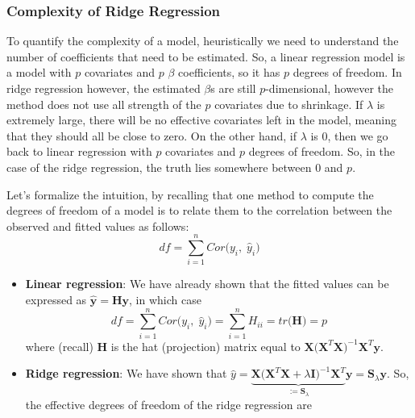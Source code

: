 \documentclass[
]{book}
\providecommand{\tightlist}{%
  \setlength{\itemsep}{0pt}\setlength{\parskip}{0pt}}
\begin{document}
\subsubsection*{Complexity of Ridge Regression}\label{complexity-of-ridge-regression}

To quantify the complexity of a model, heuristically we need to understand the number of coefficients that need to be estimated. So, a linear regression model is a model with \(p\) covariates and \(p\) \(\beta\) coefficients, so it has \(p\) degrees of freedom. In ridge regression however, the estimated \(\beta\)s are still \(p\)-dimensional, however the method does not use all strength of the \(p\) covariates due to shrinkage. If \(\lambda\) is extremely large, there will be no effective covariates left in the model, meaning that they should all be close to zero. On the other hand, if \(\lambda\) is 0, then we go back to linear regression with \(p\) covariates and \(p\) degrees of freedom. So, in the case of the ridge regression, the truth lies somewhere between 0 and \(p\).

Let's formalize the intuition, by recalling that one method to compute the degrees of freedom of a model is to relate them to the correlation between the observed and fitted values as follows:
\[df = \sum_{i=1}^{n} Cor \bigl(y_i,\; \hat{y}_i \bigr)\]

\begin{itemize}
\tightlist
\item
  \textbf{Linear regression}:
  We have already shown that the fitted values can be expressed as \(\hat{\mathbf{y}} = \mathbf{H} \mathbf{y}\), in which case
  \[df = \sum_{i=1}^{n} Cor \bigl(y_i,\; \hat{y}_i \bigr) = \sum_{i=1}^{n} H_{ii} = tr \bigl( \mathbf{H} \bigr) = p\]
  where (recall) \(\mathbf{H}\) is the hat (projection) matrix equal to \(\mathbf{X} \bigl( \mathbf{X}^T \mathbf{X} \bigr)^{-1} \mathbf{X}^T \mathbf{y}\).
\end{itemize}

\begin{itemize}
\tightlist
\item
  \textbf{Ridge regression}:
  We have shown that \(\hat{y} = \underbrace{ \mathbf{X} \bigl(\mathbf{X}^T \mathbf{X} + \lambda \mathbf{I} \bigr)^{-1} \mathbf{X}^T}_{:= \mathbf{S}_{\lambda}} \mathbf{y} = \mathbf{S}_{\lambda}\mathbf{y}\). So, the effective degrees of freedom of the ridge regression are
\end{itemize}
\end{document}
